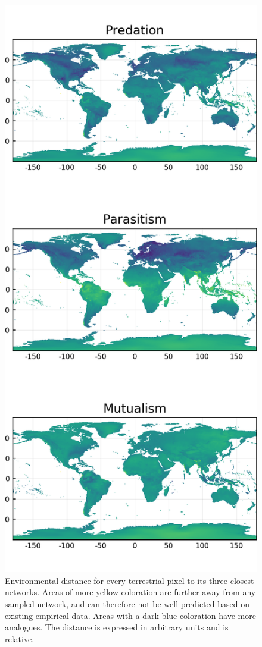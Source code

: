 \documentclass[11pt]{article}
\begin{document}
\begin{figure}
\hypertarget{fig:envspace}{%
\centering
\includegraphics{figures/combined_envirodist_maps.png}
\caption{Environmental distance for every terrestrial pixel to its three
closest networks. Areas of more yellow coloration are further away from
any sampled network, and can therefore not be well predicted based on
existing empirical data. Areas with a dark blue coloration have more
analogues. The distance is expressed in arbitrary units and is
relative.}\label{fig:envspace}
}
\end{figure}
\end{document}
